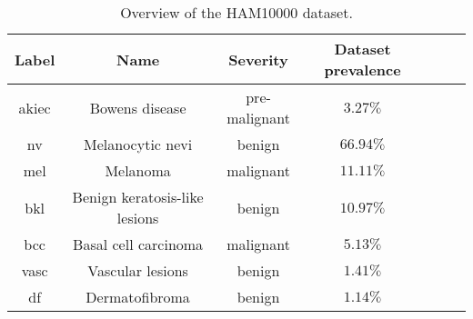 \documentclass[11pt,a4paper]{article}
\begin{document}
\begin{table}[ht]
\begin{center}
\begin{tabular}{|c|c|c|c|c|c|c|}
\hline
Label    & Name                          & Severity      & Dataset prevalence \\ \hline
akiec    & Bowens disease                & pre-malignant & $3.27\%$           \\ \hline
nv       & Melanocytic nevi              & benign        & $66.94\%$          \\ \hline
mel      & Melanoma                      & malignant     & $11.11\%$          \\ \hline
bkl      & Benign keratosis-like lesions & benign        & $10.97\%$          \\ \hline
bcc      & Basal cell carcinoma          & malignant     & $5.13\%$           \\ \hline
vasc     & Vascular lesions              & benign        & $1.41\%$           \\ \hline
df       & Dermatofibroma                & benign        & $1.14\%$           \\ \hline
\end{tabular}
\end{center}

\caption{Overview of the HAM10000 dataset.}
\label{table:ham10000}
\end{table}


\printbibliography[title={Litterature}]
\end{document}
